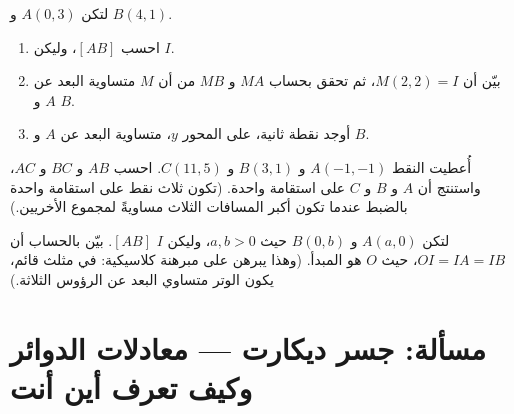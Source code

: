 \begin{exercise}[$\star\star$]\label{exo:g10:coordgeom:8}
لتكن $A(0, 3)$ و $B(4, 1)$.
\begin{enumerate}
  \item احسب   $[AB]$، وليكن $I$.
  \item بيّن أن $M(2, 2) = I$، ثم تحقق بحساب $MA$ و $MB$ من أن
        $M$ متساوية البعد عن $A$ و $B$.
  \item أوجد نقطة ثانية، على المحور $y$، متساوية البعد عن $A$ و
        $B$.
\end{enumerate}
\end{exercise}

\begin{exercise}[$\star\star$]\label{exo:g10:coordgeom:9}
أُعطيت النقط $A(-1, -1)$ و $B(3, 1)$ و $C(11, 5)$. احسب $AB$
و $BC$ و $AC$، واستنتج أن $A$ و $B$ و $C$ على استقامة واحدة. (تكون ثلاث نقط
على استقامة واحدة بالضبط عندما تكون أكبر المسافات الثلاث مساويةً لمجموع
الأخريين.)
\end{exercise}

\begin{exercise}[$\star\star\star$]\label{exo:g10:coordgeom:10}
لتكن $A(a, 0)$ و $B(0, b)$ حيث $a, b > 0$، وليكن $I$ 
$[AB]$. بيّن بالحساب أن $OI = IA = IB$، حيث $O$ هو
المبدأ. (وهذا يبرهن على مبرهنة كلاسيكية: في مثلث قائم،
يكون  الوتر متساوي البعد عن الرؤوس الثلاثة.)
\end{exercise}

\section{مسألة: جسر ديكارت --- معادلات الدوائر وكيف
تعرف أين أنت}


